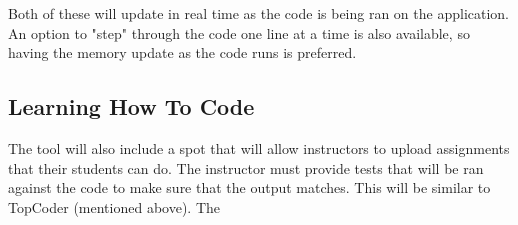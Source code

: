 Both of these will update in real time as the code is being ran on the application.
%
An option to "step" through the code one line at a time is also available, so having the memory update as the code runs is preferred.
%




\subsection{Learning How To Code}
The tool will also include a spot that will allow instructors to upload assignments that their students can do.
%
The instructor must provide tests that will be ran against the code to make sure that the output matches.
%
This will be similar to TopCoder (mentioned above).
%
The 